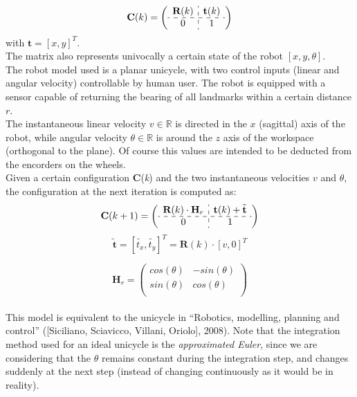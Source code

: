 \[ 
\textbf{C}(k) = 
\left( \begin{array}{c:c}
  \textbf{R}(k)  & \textbf{t}(k) \\ \hdashline
  0 & 1  \\
\end{array} \right)
\]
with $\textbf{t} = [x,y]^T$.\\
The matrix also represents univocally a certain state of the robot $[x,y,\theta]$.
\\
The robot model used is a planar unicycle, with two control inputs (linear and angular velocity) controllable by human user.
The robot is equipped with a sensor capable of returning the bearing of all landmarks within a certain distance $r$.\\
The instantaneous linear velocity $v \in \mathbb{R}$ is directed in the $x$ (sagittal) axis of the robot, while angular velocity $\theta \in \mathbb{R}$ is
around the $z$ axis of the workspace (orthogonal to the plane). Of course this values are intended to be deducted from the encorders on the wheels.\\
Given a certain configuration $\textbf{C}$(\textit{k}) and the two instantaneous velocities $v$ and $\theta$, the configuration at the next iteration is computed as:\\
\vspace{1 cm}
\[ 
\textbf{C}(k+1) = 
\left( \begin{array}{c:c}
  \textbf{R}(k) \cdot \textbf{H}_r & \textbf{t}(k) + \tilde{\textbf{t}} \\ \hdashline
  0 & 1  \\
\end{array} \right)
\]
\[ 
\tilde{\textbf{t}} = [\tilde{t_x},\tilde{t_y}]^T = \textbf{R}(k) \cdot [v,0]^T
\]

\[ 
\textbf{H}_r =
\left( \begin{array}{cc}
  cos(\theta)  & -sin(\theta)\\ 
  sin(\theta)  & cos(\theta) \\
\end{array} \right)
\]\\

This model is equivalent to the unicycle in ``Robotics, modelling, planning and control'' ([Siciliano, Sciavicco, Villani, Oriolo], 2008).
Note that the integration method used for an ideal unicycle is the \textit{approximated Euler}, since we are considering that the $\theta$ remains constant during the integration step,
and changes suddenly at the next step (instead of changing continuously as it would be in reality).\\
